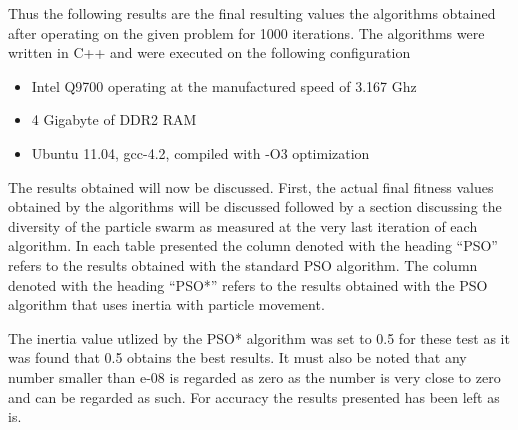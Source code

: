 Thus the following results are the final resulting values the algorithms obtained after operating on the given problem for 1000 iterations. The algorithms were written in C++ and were executed on the following configuration
\begin{itemize}
\item Intel Q9700 operating at the manufactured speed of 3.167 Ghz
\item 4 Gigabyte of DDR2 RAM
\item Ubuntu 11.04, gcc-4.2, compiled with -O3 optimization
\end{itemize}

The results obtained will now be discussed. First, the actual final fitness values obtained by the algorithms will be discussed followed by a section discussing the diversity of the particle swarm as measured at the very last iteration of each algorithm. In each table presented the column denoted with the heading ``PSO'' refers to the results obtained with the standard PSO algorithm. The column denoted with the heading ``PSO*'' refers to the results obtained with the PSO algorithm that uses inertia with particle movement. 

The inertia value utlized by the PSO* algorithm was set to 0.5 for these test as it was found that 0.5 obtains the best results. It must also be noted that any number smaller than e-08 is regarded as zero as the number is very close to zero and can be regarded as such. For accuracy the results presented has been left as is.
